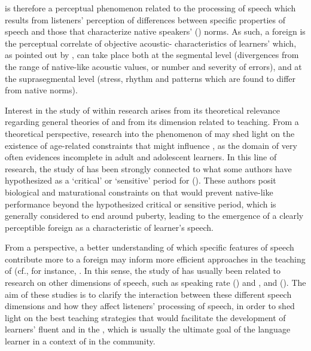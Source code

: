 \documentclass[output=paper]{langsci/langscibook}
\begin{document}
 is therefore a perceptual phenomenon related to the processing of  speech which results from listeners’ perception of differences between specific properties of  speech and those that characterize native speakers’ () norms. As such, a foreign  is the perceptual correlate of objective acoustic- characteristics of  learners’  which, as pointed out by \citet{Flege1995}, can take place both at the segmental level (divergences from the range of native-like acoustic values, or number and severity of  errors), and at the suprasegmental level (stress, rhythm and  patterns which are found to differ from native norms).

Interest in the study of  within    research arises from its theoretical relevance regarding general theories of   and from its  dimension related to  teaching. From a theoretical perspective, research into the phenomenon of  may shed light on the existence of age-related constraints that might influence  , as the domain of  very often evidences incomplete  in adult and adolescent  learners. In this line of research, the study of  has been strongly connected to what some authors have hypothesized as a ‘critical’ or ‘sensitive’ period for   (\citealt{Lenneberg1967,Scovel1988,Long1990}). These authors posit biological and maturational constraints on   that would prevent native-like   performance beyond the hypothesized critical or sensitive period, which is generally considered to end around puberty, leading to the emergence of a clearly perceptible foreign  as a characteristic of  learner’s speech.

From a  perspective, a better understanding of which specific features of  speech contribute more to a foreign  may inform more efficient approaches in the teaching of   (cf., for instance, \cite{PiskeEtAl2001}. In this sense, the study of  has usually been related to research on other dimensions of  speech, such as speaking rate (\citealt{MunroDerwing1998}) and ,  and  (\citealt{MunroDerwing1995,DerwingMunro1997,DerwingMunro2013}). The aim of these studies is to clarify the interaction between these different speech dimensions and how they affect listeners’ processing of  speech, in order to shed light on the best teaching strategies that would facilitate the development of  learners’ fluent and  in the , which is usually the ultimate goal of the language learner in a context of  in the  community. 
\end{document}
